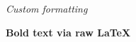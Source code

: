 \documentclass[a4paper,10pt,fleqn]{article}
\begin{document}
\begin{center}\textit{Custom formatting}\end{center}

\vspace{1cm}

\textbf{Bold text via raw LaTeX}
\end{document}
